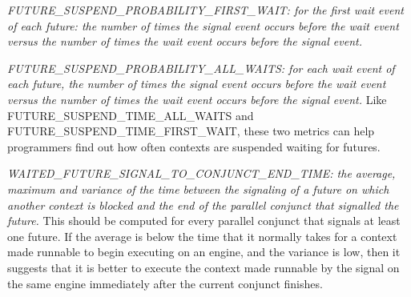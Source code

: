 

\emph{FUTURE\_SUSPEND\_PROBABILITY\_FIRST\_WAIT:
for the first wait event of each future:
the number of times the signal event occurs before the wait event versus
the number of times the wait event occurs before the signal event.}

\emph{FUTURE\_SUSPEND\_PROBABILITY\_ALL\_WAITS:
for each wait event of each future,
the number of times the signal event occurs before the wait event versus
the number of times the wait event occurs before the signal event.}
Like FUTURE\_SUSPEND\_TIME\_ALL\_WAITS and FUTURE\_SUSPEND\_TIME\_FIRST\_WAIT,
these two metrics can help programmers find out
how often contexts are suspended waiting for futures.

\emph{WAITED\_FUTURE\_SIGNAL\_TO\_CONJUNCT\_END\_TIME:
the average, maximum and variance of the time
between the signaling of a future on which another context is blocked
and the end of the parallel conjunct that signalled the future.}
This should be computed for every parallel conjunct
that signals at least one future.
If the average is below the time that it normally takes
for a context made runnable to begin executing on an engine,
and the variance is low, then it suggests that
it is better to execute the context made runnable by the signal
on the same engine immediately after the current conjunct finishes.

